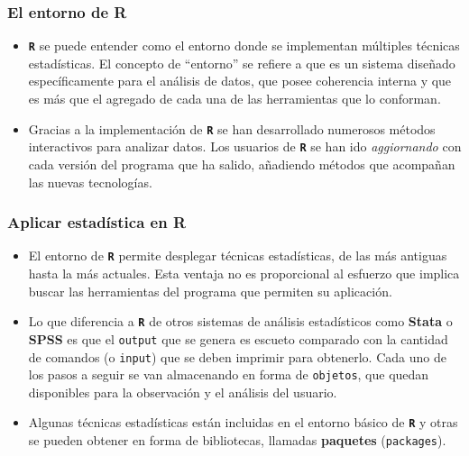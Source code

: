 \documentclass[
]{article}
\begin{document}
\hypertarget{el-entorno-de-r}{%
\subsubsection{El entorno de R}\label{el-entorno-de-r}}

\begin{itemize}
\item
  \textbf{\texttt{R}} se puede entender como el entorno donde se implementan múltiples técnicas estadísticas. El concepto de ``entorno'' se refiere a que es un sistema diseñado específicamente para el análisis de datos, que posee coherencia interna y que es más que el agregado de cada una de las herramientas que lo conforman.
\item
  Gracias a la implementación de \textbf{\texttt{R}} se han desarrollado numerosos métodos interactivos para analizar datos. Los usuarios de \textbf{\texttt{R}} se han ido \emph{aggiornando} con cada versión del programa que ha salido, añadiendo métodos que acompañan las nuevas tecnologías.
\end{itemize}

\hypertarget{aplicar-estaduxedstica-en-r}{%
\subsubsection{Aplicar estadística en R}\label{aplicar-estaduxedstica-en-r}}

\begin{itemize}
\item
  El entorno de \textbf{\texttt{R}} permite desplegar técnicas estadísticas, de las más antiguas hasta la más actuales. Esta ventaja no es proporcional al esfuerzo que implica buscar las herramientas del programa que permiten su aplicación.
\item
  Lo que diferencia a \textbf{\texttt{R}} de otros sistemas de análisis estadísticos como \textbf{Stata} o \textbf{SPSS} es que el \texttt{output} que se genera es escueto comparado con la cantidad de comandos (o \texttt{input}) que se deben imprimir para obtenerlo. Cada uno de los pasos a seguir se van almacenando en forma de \texttt{objetos}, que quedan disponibles para la observación y el análisis del usuario.
\item
  Algunas técnicas estadísticas están incluidas en el entorno básico de \textbf{\texttt{R}} y otras se pueden obtener en forma de bibliotecas, llamadas \textbf{paquetes} (\texttt{packages}).
\end{itemize}
\end{document}
